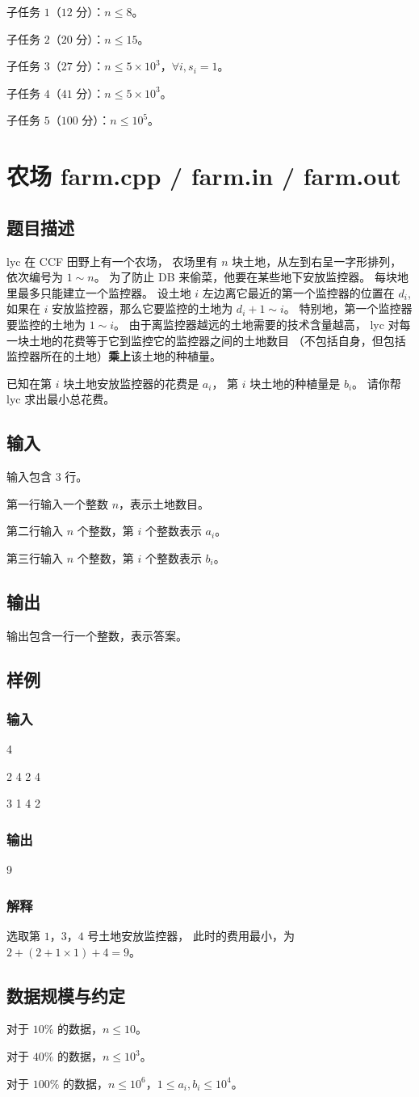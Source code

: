 \documentclass[UTF8]{article}
\newcommand \Problem [2] {\newpage \section{#1 \small{#2.cpp / #2.in / #2.out}}}
\newcommand \Description {\subsection{题目描述}}
\newcommand \Input {\subsection{输入}}
\newcommand \Output {\subsection{输出}}
\newcommand \Sample [1][] {\subsection{样例 #1}}
\newcommand \SampleInput {\subsubsection{输入}}
\newcommand \SampleOutput {\subsubsection{输出}}
\newcommand \Explanation {\subsubsection{解释}}
\newcommand \Constraint {\subsection{数据规模与约定}}
\begin{document}
	子任务 $1$（$12$ 分）：$n \le 8$。

	子任务 $2$（$20$ 分）：$n \le 15$。

	子任务 $3$（$27$ 分）：$n \le 5 \times 10^3$，$\forall i, s_i = 1$。

	子任务 $4$（$41$ 分）：$n \le 5 \times 10^3$。

	子任务 $5$（$100$ 分）：$n \le 10^5$。

	\Problem {农场} {farm}

	\Description

	lyc 在 CCF 田野上有一个农场，
	农场里有 $n$ 块土地，从左到右呈一字形排列，
	依次编号为 $1 \sim n$。
	为了防止 DB 来偷菜，他要在某些地下安放监控器。
	每块地里最多只能建立一个监控器。
	设土地 $i$ 左边离它最近的第一个监控器的位置在 $d_i$,
	如果在 $i$ 安放监控器，那么它要监控的土地为 $d_i + 1 \sim i$。
	特别地，第一个监控器要监控的土地为 $1 \sim i$。
	由于离监控器越远的土地需要的技术含量越高，
	lyc 对每一块土地的花费等于它到监控它的监控器之间的土地数目
	（不包括自身，但包括监控器所在的土地）\textbf{乘上}该土地的种植量。

	已知在第 $i$ 块土地安放监控器的花费是 $a_i$，
	第 $i$ 块土地的种植量是 $b_i$。
	请你帮 lyc 求出最小总花费。

	\Input

	输入包含 $3$ 行。

	第一行输入一个整数 $n$，表示土地数目。

	第二行输入 $n$ 个整数，第 $i$ 个整数表示 $a_i$。

	第三行输入 $n$ 个整数，第 $i$ 个整数表示 $b_i$。

	\Output

	输出包含一行一个整数，表示答案。

	\Sample

	\SampleInput

	4

	2 4 2 4

	3 1 4 2

	\SampleOutput

	9

	\Explanation

	选取第 $1$，$3$，$4$ 号土地安放监控器，
	此时的费用最小，为 $2 + (2 + 1 \times 1) + 4 = 9$。

	\Constraint

	对于 $10 \%$ 的数据，$n \le 10$。

	对于 $40 \%$ 的数据，$n \le 10^3$。

	对于 $100 \%$ 的数据，$n \le 10^6$，$1 \le a_i, b_i \le 10^4$。
\end{document}
